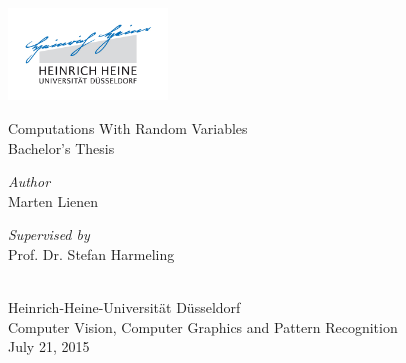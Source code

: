 \documentclass[11pt,a4paper]{book}
\begin{document}
\pagestyle{empty}

\frontmatter


\begin{titlepage}
  \begingroup
  \begin{center}
    \includegraphics[width=120pt]{thesis/logo}\\

    \vspace{9em}

    {\Huge Computations With Random Variables}\\
    \vspace{2em}
    {\large Bachelor's Thesis}\\
    \vfill
    \begin{minipage}{0.4\textwidth}
      \begin{flushleft}
        \emph{Author}\\
        \vspace{0.3em}
        {\Large Marten Lienen}
      \end{flushleft}
    \end{minipage}
    \hfill
    \begin{minipage}{0.4\textwidth}
      \begin{flushright}
        \emph{Supervised by}\\
        \vspace{0.3em}
        {\Large Prof. Dr. Stefan Harmeling}
      \end{flushright}
    \end{minipage}
    \\
    \vspace{6em}
    {\Large Heinrich-Heine-Universität Düsseldorf}\\
    \vspace{0.5em}
    {\large Computer Vision, Computer Graphics and Pattern Recognition}\\
    \vspace{1em}
    July 21, 2015
  \end{center}
  \endgroup
\end{titlepage}

\cleardoublepage
\end{document}
